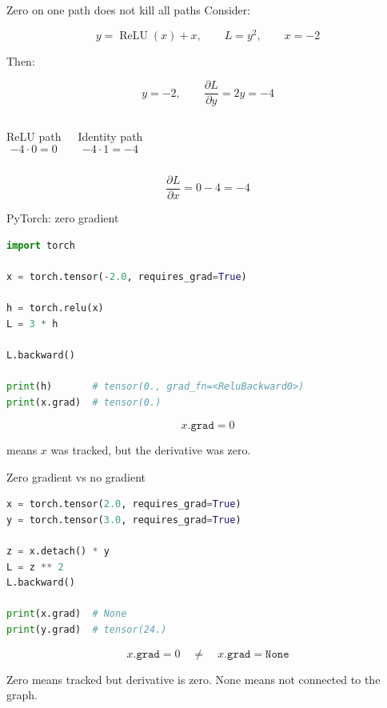 \documentclass[10pt,aspectratio=169]{beamer}
\newcommand{\grad}[2]{\frac{\partial #1}{\partial #2}}
\begin{document}
\begin{frame}[t]{Zero on one path does not kill all paths}
Consider:

\[
y=\operatorname{ReLU}(x)+x,\qquad L=y^2,\qquad x=-2
\]

Then:

\[
y=-2,\qquad \grad{L}{y}=2y=-4
\]

\begin{columns}[T]
\begin{block}{ReLU path}
\[
-4\cdot 0=0
\]
\end{block}

\begin{block}{Identity path}
\[
-4\cdot 1=-4
\]
\end{block}
\end{columns}

\vfill

\[
\boxed{\grad{L}{x}=0-4=-4}
\]
\end{frame}

\begin{frame}[fragile,t]{PyTorch: zero gradient}
\begin{lstlisting}[language=Python]
import torch

x = torch.tensor(-2.0, requires_grad=True)

h = torch.relu(x)
L = 3 * h

L.backward()

print(h)       # tensor(0., grad_fn=<ReluBackward0>)
print(x.grad)  # tensor(0.)
\end{lstlisting}

\vfill

\[
x.\texttt{grad}=0
\]

means \(x\) was tracked, but the derivative was zero.
\end{frame}

\begin{frame}[fragile,t]{Zero gradient vs no gradient}
\begin{lstlisting}[language=Python]
x = torch.tensor(2.0, requires_grad=True)
y = torch.tensor(3.0, requires_grad=True)

z = x.detach() * y
L = z ** 2
L.backward()

print(x.grad)  # None
print(y.grad)  # tensor(24.)
\end{lstlisting}

\vfill

\[
x.\texttt{grad}=0
\quad\neq\quad
x.\texttt{grad}=\texttt{None}
\]

Zero means tracked but derivative is zero.  
None means not connected to the graph.
\end{frame}
\end{document}
